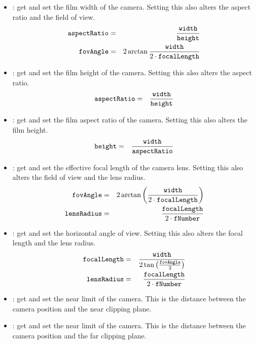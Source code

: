 \begin{itemize}
 	\item {}:
 	  get and set the film width of the camera.  Setting this also alters the aspect ratio and the field of view.
	  \begin{eqnarray}
	  	\kw{aspectRatio} &=& \frac{\kw{width}}{\kw{height}}\\
	  	\kw{fovAngle} &=& 2 \arctan \frac{\kw{width}}{2 \cdot \kw{focalLength}}
	  \end{eqnarray}
		
 	\item {}:
 	  get and set the film height of the camera.  Setting this also alters the aspect ratio.
	  \begin{eqnarray}
	  	\kw{aspectRatio} &=& \frac{\kw{width}}{\kw{height}}
	  \end{eqnarray}
		
 	\item {}:
 	  get and set the film aspect ratio of the camera.  Setting this also alters the film height.
	  \begin{eqnarray}
	  	\kw{height} &=& \frac{\kw{width}}{\kw{aspectRatio}}
	  \end{eqnarray}
		
 	\item {}:
 	  get and set the effective focal length of the camera lens.  Setting this also alters the field of view and the lens radius.
	  \begin{eqnarray}
	  	\kw{fovAngle} &=& 2 \arctan \left(\frac{\kw{width}}{2 \cdot \kw{focalLength}}\right)\\
	  	\kw{lensRadius} &=& \frac{\kw{focalLength}}{2 \cdot \kw{fNumber}}
	  \end{eqnarray}
		
 	\item {}:
 	  get and set the horizontal angle of view.  Setting this also alters the focal length and the lens radius.
	  \begin{eqnarray}
	  	\kw{focalLength} &=& \frac{\kw{width}}{2 \tan \left(\frac{\kw{fovAngle}}{2}\right)}\\
	  	\kw{lensRadius} &=& \frac{\kw{focalLength}}{2 \cdot \kw{fNumber}}
	  \end{eqnarray}
		
 	\item {}:
 	  get and set the near limit of the camera.  This is the distance between the camera position and the near clipping plane.
		
 	\item {}:
 	  get and set the near limit of the camera.  This is the distance between the camera position and the far clipping plane.
 	  

\end{itemize}
